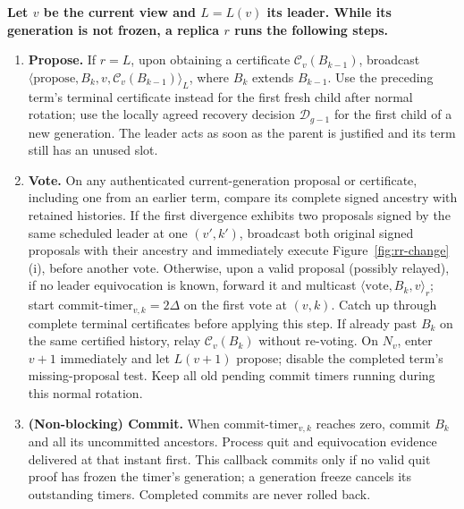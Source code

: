 \documentclass[10pt,a4paper]{article}
\newcommand{\RR}[1]{{\color{red!70!black}#1}}
\newcommand{\cert}{\mathcal C}
\newcommand{\decide}{\mathcal D}
\begin{document}
\begin{minipage}{\linewidth}
\begin{mdframed}[linewidth=.65pt,innertopmargin=5pt,innerbottommargin=5pt]
\textbf{Let $v$ be the current view and $L=L(v)$ its leader. While its
generation is not frozen, a replica $r$ runs the following steps.}
\begin{enumerate}[label=\arabic*),itemsep=3pt]
\item \textbf{Propose.} If $r=L$, upon obtaining a certificate
$\cert_v(B_{k-1})$, broadcast
$\langle\mathrm{propose},B_k,v,\cert_v(B_{k-1})\rangle_L$, where
$B_k$ extends $B_{k-1}$.
\RR{Use the preceding term's terminal certificate instead for the first
fresh child after normal rotation; use the locally agreed recovery decision
$\decide_{g-1}$ for the first child of a new generation. The leader acts as
soon as the parent is justified and its term still has an unused slot.}

\item \textbf{Vote.} \RR{On any authenticated current-generation proposal
or certificate, including one from an earlier term, compare its complete
signed ancestry with retained histories. If the first divergence exhibits
two proposals signed by the same scheduled leader at one $(v',k')$,
broadcast both original signed proposals with their ancestry and immediately
execute Figure~\ref{fig:rr-change}(i), before another vote.}
Otherwise, upon a valid proposal (possibly relayed), if no leader
equivocation is known, forward it and multicast
$\langle\mathrm{vote},B_k,v\rangle_r$; start
$\mathrm{commit\text{-}timer}_{v,k}=2\Delta$ on the first vote at $(v,k)$.
\RR{Catch up through complete terminal certificates before applying this
step. If already past $B_k$ on the same certified history, relay
$\cert_v(B_k)$ without re-voting. On $N_v$, enter $v+1$ immediately and
let $L(v+1)$ propose; disable the completed term's missing-proposal test.
Keep all old pending commit timers running during this normal rotation.}

\item \textbf{(Non-blocking) Commit.} When
$\mathrm{commit\text{-}timer}_{v,k}$ reaches zero, commit $B_k$ and all its
uncommitted ancestors. \RR{Process quit and equivocation evidence delivered
at that instant first. This callback commits only if no valid quit proof has
frozen the timer's generation; a generation freeze cancels its outstanding
timers. Completed commits are never rolled back.}
\end{enumerate}
\end{mdframed}
\label{fig:rr-steady}
\end{minipage}
\end{document}
